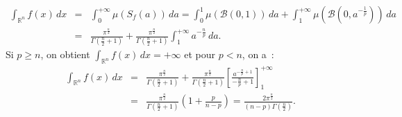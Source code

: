 {\begin{enumerate}
{\begin{eqnarray*}
\int_{\mathbb{R}^{n}} f(x)\,dx &=& \int_{0}^{+\infty}
\mu\left(S_{f}(a)\right)\,da = \int_{0}^{1}
\mu\left(\mathcal{B}(0,1) \right)\,da + \int_{1}^{+\infty}
\mu\left(\mathcal{B}(0, a^{-\frac{1}{p}})\right)\,da\\
& = & \frac{\pi^{\frac{n}{2}}}{\Gamma\left(\frac{n}{2}+1\right)} +
\frac{\pi^{\frac{n}{2}}}{\Gamma\left(\frac{n}{2}+1\right)}\int_{1}^{+\infty}
a^{-\frac{n}{p}}\,da.
\end{eqnarray*}
Si $p\geq n$, on obtient $\int_{\mathbb{R}^{n}} f(x)\,dx =+\infty$
et pour $p<n$, on a~:
\begin{eqnarray*}
\int_{\mathbb{R}^{n}} f(x)\,dx & =
&\frac{\pi^{\frac{n}{2}}}{\Gamma\left(\frac{n}{2}+1\right)} +
\frac{\pi^{\frac{n}{2}}}{\Gamma\left(\frac{n}{2}+1\right)}\left[\frac{a^{-\frac{n}{p}+1}}{-\frac{n}{p}+1}\right]_{1}^{+\infty}\\
&=&\frac{\pi^{\frac{n}{2}}}{\Gamma\left(\frac{n}{2}+1\right)}\left(1
+ \frac{p}{n-p} \right) = \frac{2\pi^{\frac{n}{2}}}{(n -
p)\Gamma\left(\frac{n}{2}\right)}.
\end{eqnarray*}}
\end{enumerate}
}
